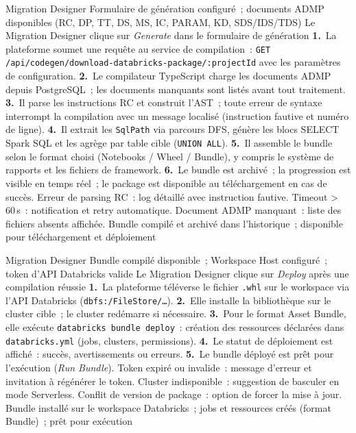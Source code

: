   {Migration Designer}
  {Formulaire de génération configuré~; documents ADMP disponibles (RC, DP, TT, DS, MS, IC, PARAM, KD, SDS/IDS/TDS)}
  {Le Migration Designer clique sur \textit{Generate} dans le formulaire de génération}
  {\textbf{1.}~La plateforme soumet une requête au service de compilation~: \texttt{GET /api/codegen/download-databricks-package/:projectId} avec les paramètres de configuration.\newline
   \textbf{2.}~Le compilateur TypeScript charge les documents ADMP depuis PostgreSQL~; les documents manquants sont listés avant tout traitement.\newline
   \textbf{3.}~Il parse les instructions RC et construit l'AST~; toute erreur de syntaxe interrompt la compilation avec un message localisé (instruction fautive et numéro de ligne).\newline
   \textbf{4.}~Il extrait les \texttt{SqlPath} via parcours DFS, génère les blocs SELECT Spark SQL et les agrège par table cible (\texttt{UNION ALL}).\newline
   \textbf{5.}~Il assemble le bundle selon le format choisi (Notebooks / Wheel / Bundle), y compris le système de rapports et les fichiers de framework.\newline
   \textbf{6.}~Le bundle est archivé~; la progression est visible en temps réel~; le package est disponible au téléchargement en cas de succès.}
  {Erreur de parsing RC~: log détaillé avec instruction fautive. Timeout > 60\,s~: notification et retry automatique. Document ADMP manquant~: liste des fichiers absents affichée.}
  {Bundle compilé et archivé dans l'historique~; disponible pour téléchargement et déploiement}

\medskip

  {Migration Designer}
  {Bundle compilé disponible~; Workspace Host configuré~; token d'API Databricks valide}
  {Le Migration Designer clique sur \textit{Deploy} après une compilation réussie}
  {\textbf{1.}~La plateforme téléverse le fichier \texttt{.whl} sur le workspace via l'API Databricks (\texttt{dbfs:/FileStore/\ldots}).\newline
   \textbf{2.}~Elle installe la bibliothèque sur le cluster cible~; le cluster redémarre si nécessaire.\newline
   \textbf{3.}~Pour le format Asset Bundle, elle exécute \texttt{databricks bundle deploy}~: création des ressources déclarées dans \texttt{databricks.yml} (jobs, clusters, permissions).\newline
   \textbf{4.}~Le statut de déploiement est affiché~: succès, avertissements ou erreurs.\newline
   \textbf{5.}~Le bundle déployé est prêt pour l'exécution (\textit{Run Bundle}).}
  {Token expiré ou invalide~: message d'erreur et invitation à régénérer le token. Cluster indisponible~: suggestion de basculer en mode Serverless. Conflit de version de package~: option de forcer la mise à jour.}
  {Bundle installé sur le workspace Databricks~; jobs et ressources créés (format Bundle)~; prêt pour exécution}

